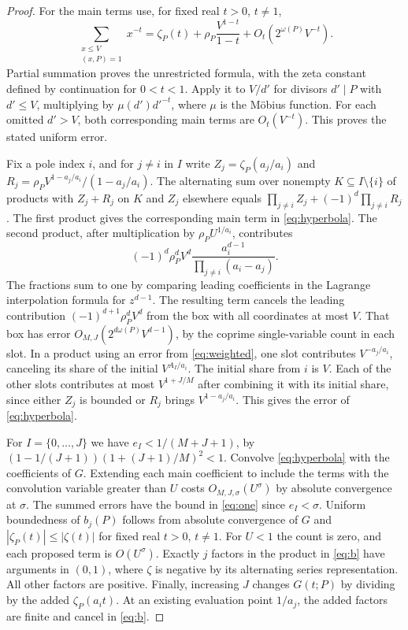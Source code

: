 \documentclass[11pt,reqno]{amsart}
\begin{document}
\begin{proof}
For the main terms use, for fixed real \(t>0\), \(t\ne1\),
\begin{equation}\label{eq:weighted}
  \sum_{\substack{x\le V\\(x,P)=1}}x^{-t}
  =\zeta_P(t)+\rho_P\frac{V^{1-t}}{1-t}
      +O_t(2^{\omega(P)}V^{-t}).
\end{equation}
Partial summation proves the unrestricted formula, with the zeta
constant defined by continuation for \(0<t<1\). Apply it to
\(V/d'\) for divisors \(d'\mid P\) with \(d'\le V\), multiplying by
\(\mu(d')d'^{-t}\), where \(\mu\) is the M\"obius function. For each
omitted \(d'>V\), both corresponding main terms are
\(O_t(V^{-t})\). This proves the stated uniform error.

Fix a pole index \(i\), and for \(j\ne i\) in \(I\) write
\(Z_j=\zeta_P(a_j/a_i)\) and
\(R_j=\rho_P V^{1-a_j/a_i}/(1-a_j/a_i)\). The alternating sum over
nonempty \(K\subseteq I\setminus\{i\}\) of products with \(Z_j+R_j\)
on \(K\) and \(Z_j\) elsewhere equals
\(\prod_{j\ne i} Z_j+(-1)^d\prod_{j\ne i}R_j\). The first product gives
the corresponding main term in \eqref{eq:hyperbola}. The second
product, after multiplication by \(\rho_P U^{1/a_i}\), contributes
\[
  (-1)^d\rho_P^d V^d\frac{a_i^{d-1}}{\prod_{j\ne i}(a_i-a_j)}.
\]
The fractions sum to one by comparing leading coefficients in the
Lagrange interpolation formula for \(z^{d-1}\). The resulting term
cancels the leading contribution \((-1)^{d+1}\rho_P^dV^d\) from the
box with all coordinates at most \(V\). That box has error
\(O_{M,J}(2^{d\omega(P)}V^{d-1})\), by the coprime single-variable
count in each slot. In a product using an error from \eqref{eq:weighted},
one slot contributes \(V^{-a_j/a_i}\), canceling its share of the initial
\(V^{A_I/a_i}\). The initial share from \(i\) is \(V\). Each of the
other slots contributes at most \(V^{1+J/M}\) after combining it with
its initial share, since either \(Z_j\) is bounded or \(R_j\) brings
\(V^{1-a_j/a_i}\). This gives the error of \eqref{eq:hyperbola}.

For \(I=\{0,\ldots,J\}\) we have \(e_I<1/(M+J+1)\), by
\((1-1/(J+1))(1+(J+1)/M)^2<1\). Convolve \eqref{eq:hyperbola} with
the coefficients of \(G\). Extending each main coefficient to include
the terms with the convolution variable greater than \(U\) costs
\(O_{M,J,\sigma}(U^\sigma)\) by absolute convergence at \(\sigma\).
The summed errors have the bound in \eqref{eq:one} since \(e_I<\sigma\).
Uniform boundedness of \(b_j(P)\) follows from absolute convergence of
\(G\) and \(|\zeta_P(t)|\le|\zeta(t)|\) for fixed real \(t>0\),
\(t\ne1\). For \(U<1\) the count is zero, and each proposed term is
\(O(U^\sigma)\). Exactly \(j\) factors in the product in \eqref{eq:b}
have arguments in \((0,1)\), where \(\zeta\) is negative by its
alternating series representation. All other factors are positive.
Finally, increasing \(J\) changes \(G(t;P)\) by dividing by the added
\(\zeta_P(a_i t)\). At an existing evaluation point \(1/a_j\), the added
factors are finite and cancel in \eqref{eq:b}.
\end{proof}
\end{document}
